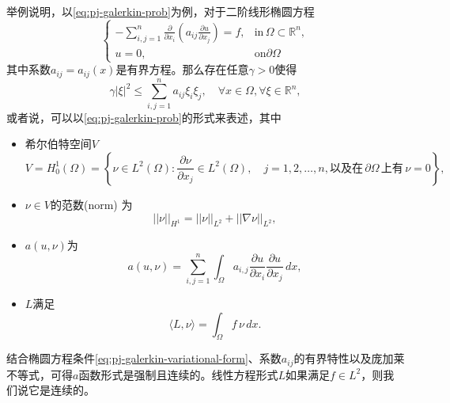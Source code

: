 \begin{subappendices}
举例说明，以\eqref{eq:pj-galerkin-prob}为例，对于二阶线形椭圆方程
  \begin{equation*}
    \begin{cases}
      -\sum_{i,j=1}^{n} \frac{\partial}{\partial x_i} \left( a_{ij} \frac{\partial u}{\partial x_j} \right) = f, & \text{in} \, \Omega \subset \mathbb{R}^n,\\
      u = 0, & \text{on} \partial \Omega
    \end{cases}
  \end{equation*}
  其中系数$a_{ij} = a_{ij}(x)$是有界方程。那么存在任意$\gamma > 0$使得
  \begin{equation}
    \label{eq:pj-galerkin-variational-form}
    \gamma |\xi|^2 \le \sum_{i,j=1}^n a_{ij} \xi_i \xi_j, \quad \forall x \in \Omega, \forall \xi \in \mathbb{R}^n,
  \end{equation}
或者说，可以以\eqref{eq:pj-galerkin-prob}的形式来表述，其中
\begin{itemize}
  \item 希尔伯特空间$V$
  \begin{equation*}
    V = H_{0}^{1}(\Omega) = \left\{ \nu \in L^2(\Omega) : \frac{\partial \nu}{\partial x_j} \in L^2(\Omega), \quad j=1,2,\ldots,n, \text{以及在}\, \partial \Omega \, \text{上有} \, \nu=0 \right\},
  \end{equation*}
  \item $\nu \in V$的范数(norm) 为
  \begin{equation*}
    || \nu ||_{H^1} = ||\nu ||_{L^2} + ||\nabla \nu ||_{L^2},
  \end{equation*}
  \item $a(u,\nu)$为
  \begin{equation*}
    a(u,\nu) = \sum_{i,j=1}^n \int_{\Omega}a_{i,j} \frac{\partial u}{\partial x_i} \frac{\partial u}{\partial x_j} \, d x,
  \end{equation*}
  \item $L$满足
  \begin{equation*}
    \langle L, \nu \rangle = \int_{\Omega} f \, \nu \, dx.
  \end{equation*}
\end{itemize}

结合椭圆方程条件\eqref{eq:pj-galerkin-variational-form}、系数$a_{ij}$的有界特性以及庞加莱不等式，可得$a$函数形式是强制且连续的。线性方程形式$L$如果满足$f \in L^2$，则我们说它是连续的。


\end{subappendices}
